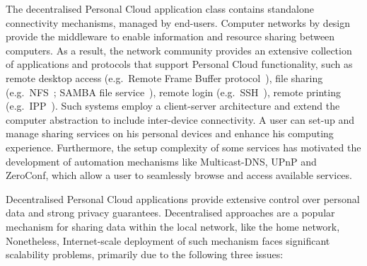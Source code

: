 The decentralised Personal Cloud application class contains standalone
connectivity mechanisms, managed by end-users.  Computer networks by design 
provide the middleware to enable information and resource sharing between
computers. As a result, the network community provides an extensive collection
of applications and protocols that support Personal Cloud functionality, such as
remote desktop access (e.g.~Remote Frame Buffer protocol~), file
sharing (e.g.~NFS~; SAMBA file service~), remote login
(e.g.~SSH~), remote printing (e.g.~IPP~).
Such systems employ a client-server architecture and extend the computer
abstraction to include inter-device connectivity.  A user can set-up and manage
sharing services on his personal devices and enhance his computing experience.
Furthermore, the setup complexity of some services has motivated the
development of automation mechanisms like Multicast-DNS, UPnP and ZeroConf,
which allow a user to seamlessly browse and access available services. 

Decentralised Personal Cloud applications provide extensive control over
personal data and strong privacy guarantees. Decentralised approaches are a
popular mechanism for sharing data  within the local network, like the home
network, Nonetheless, Internet-scale deployment of such mechanism faces
significant scalability problems, primarily due to the following three issues:

